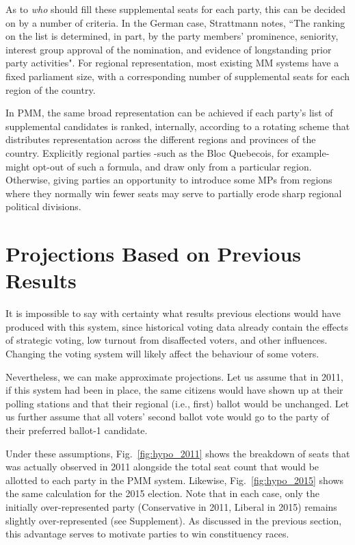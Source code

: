 \documentclass[DIV=calc, paper=a4, fontsize=11pt, twocolumn]{scrartcl}	 %
\begin{document}
As to \emph{who} should fill these supplemental seats for each party, this can be decided on by a number of criteria. 
In the German case, Strattmann notes\cite{Stratmann}, ``The ranking on the list is determined, in part, by the party members' prominence, seniority, interest group approval of the nomination, and evidence of longstanding prior party activities". 
For regional representation, most existing MM systems have a fixed parliament size, with a corresponding number of supplemental seats for each region of the country. 

In PMM, the same broad representation can be achieved if each party's list of supplemental candidates is ranked, internally, according to a rotating scheme that distributes representation across the different regions and provinces of the country. 
Explicitly regional parties \--such as the Bloc Quebecois, for example\-- might opt-out of such a formula, and draw only from a particular region. 
Otherwise, giving parties an opportunity to introduce some MPs from regions where they normally win fewer seats may serve to partially erode sharp regional political divisions.


\section{Projections Based on Previous Results}
\label{sec:projections}

It is impossible to say with certainty what results previous elections would have produced with this system, since historical voting data already contain the effects of strategic voting, low turnout from disaffected voters, and other influences. Changing the voting system will likely affect the behaviour of some voters.

Nevertheless, we can make approximate projections. Let us assume that in 2011, if this system had been in place, the same citizens would have shown up at their polling stations and that their regional (i.e., first) ballot would be unchanged. 
Let us further assume that all voters' second ballot vote would go to the party of their preferred ballot-1 candidate. 

Under these assumptions, Fig.~\ref{fig:hypo_2011} shows the breakdown of seats that was actually observed in 2011 alongside the total seat count that would be allotted to each party in the PMM system. Likewise, Fig.~\ref{fig:hypo_2015} shows the same calculation for the 2015 election. 
Note that in each case, only the initially over-represented party (Conservative in 2011, Liberal in 2015) remains slightly over-represented (see Supplement). 
As discussed in the previous section, this advantage serves to motivate parties to win constituency races.
\end{document}

